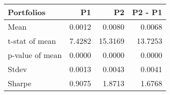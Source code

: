 \begin{tabular}{lrrr}
\toprule
Portfolios & P1 & P2 & P2 - P1 \\
\midrule
Mean & 0.0012 & 0.0080 & 0.0068 \\
t-stat of mean & 7.4282 & 15.3169 & 13.7253 \\
p-value of mean & 0.0000 & 0.0000 & 0.0000 \\
Stdev & 0.0013 & 0.0043 & 0.0041 \\
Sharpe & 0.9075 & 1.8713 & 1.6768 \\
\bottomrule
\end{tabular}
